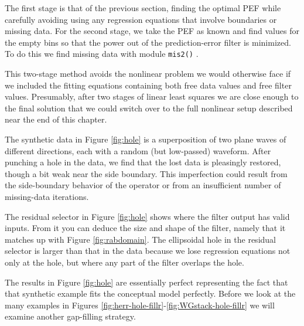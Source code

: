 \par
The first stage is that of the previous section,
finding the optimal PEF while
carefully avoiding using any regression equations
that involve boundaries or missing data.
For the second stage, we take the PEF as known and
find values for the empty bins so that
the power out of the prediction-error filter is minimized.
To do this we find missing data with
module \texttt{mis2()} .

\par
This two-stage method avoids the nonlinear problem
we would otherwise face if we included the fitting
equations containing both free data values and free filter values.
Presumably, after
two stages of linear least squares
we are close enough to the final solution
that we could switch over to the full nonlinear setup
described near the end of this chapter.

\par
The synthetic data in Figure \ref{fig:hole}
is a superposition of two plane waves of different directions,
each with a random (but low-passed) waveform.
After punching a hole in the data,
we find that the lost data is pleasingly restored,
though a bit weak near the side boundary.
This imperfection could result
from the side-boundary behavior of the operator
or from an insufficient number of missing-data iterations.
\par
The residual selector in Figure \ref{fig:hole}
shows where the filter output has valid inputs.
From it you can deduce the size and shape of the filter,
namely that it matches up with Figure \ref{fig:rabdomain}.
The ellipsoidal hole in the residual selector is larger
than that in the data because we lose regression equations
not only at the hole,
but where any part of the filter overlaps the hole.

\par
The results in Figure \ref{fig:hole} are essentially perfect
representing the fact that that synthetic example
fits the conceptual model perfectly.
Before we look at the many examples
in Figures
\ref{fig:herr-hole-fillr}-\ref{fig:WGstack-hole-fillr}
we will examine another gap-filling strategy.




